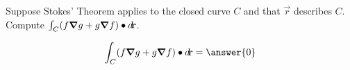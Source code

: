 \documentclass{ximera}
\author{David Guichard \and Neal Koblitz \and H. Jerome Keisler \and Albert Scheller \and Barry Balof \and Mike Wills \and Matthew Carr}
\begin{document}
\begin{exercise}




Suppose Stokes' Theorem applies to the closed curve $C$ and that $\vec{r}$ describes $C$. Compute $\int_{C}(f\boldsymbol\nabla g+g\boldsymbol\nabla f)\bullet\mathop{}\!d\!\mathbf{r}$.

\begin{prompt}
\[
\int_{C}(f\grad g+g\grad f)\dotp\d\vec{r}=\answer{0}
\]
\end{prompt}


\end{exercise}
\end{document}
